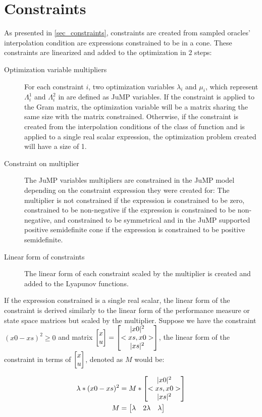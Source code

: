 \section{Constraints}

As presented in \ref{sec_constraints}, constraints are created from sampled oracles' interpolation condition are expressions constrained to be in a cone. These constraints are linearized and added to the optimization in 2 steps:
\begin{description}
    \item [Optimization variable multipliers] For each constraint $i$, two optimization variables $\lambda_i$ and $\mu_i$, which represent $\Lambda^1_i$ and $\Lambda^2_i$ in  are defined as JuMP variables. If the constraint is applied to the Gram matrix, the optimization variable will be a matrix sharing the same size with the matrix constrained. Otherwise, if the constraint is created from the interpolation conditions of the class of function and is applied to a single real scalar expression, the optimization problem created will have a size of 1.
    \item [Constraint on multiplier] The JuMP variables multipliers are constrained in the JuMP model depending on the constraint expression they were created for: The multiplier is not constrained if the expression is constrained to be zero, constrained to be non-negative if the expression is constrained to be non-negative, and constrained to be symmetrical and in the JuMP supported positive semidefinite cone if the expression is constrained to be positive semidefinite.
    \item [Linear form of constraints] The linear form of each constraint scaled by the multiplier is created and added to the Lyapunov functions.
\end{description}

If the expression constrained is a single real scalar, the linear form of the constraint is derived similarly to the linear form of the performance measure or state space matrices but scaled by the multiplier. Suppose we have the constraint $(x0 - xs)^2 \geq 0$ and matrix $\begin{bmatrix}x\\ u\end{bmatrix} = \begin{bmatrix}|x0|^2\\ <xs, x0>\\ |xs|^2\end{bmatrix}$, the linear form of the constraint in terms of $\begin{bmatrix}x\\ u\end{bmatrix}$, denoted as $M$ would be:

\begin{subequations} \label{eqn:constraint_single}
	\begin{align}
    \lambda * (x0 - xs)^2 &= M * \begin{bmatrix}|x0|^2\\ <xs, x0>\\ |xs|^2\end{bmatrix} \label{eq_cons_single1}       \\
	M &= \begin{bmatrix}\lambda& 2\lambda & \lambda\end{bmatrix} \label{eq_cons_single2}
	\end{align}
\end{subequations}

